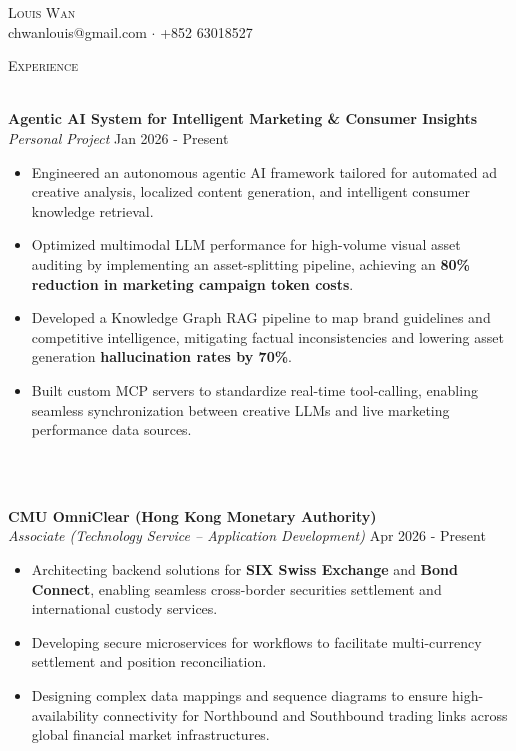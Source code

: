 \documentclass[a4paper]{article}
\newcommand{\lineunder} {
    \vspace*{-8pt} \\
    \hspace*{-18pt} \hrulefill \\
}
\newcommand{\header} [1] {
    {\hspace*{-18pt}\vspace*{6pt} \textsc{#1}}
    \vspace*{-6pt} \lineunder
}
\begin{document}
\vspace*{-40pt}

    

\vspace*{-10pt}
\begin{center}
	{\Huge \scshape {Louis Wan}}\\
	chwanlouis@gmail.com $\cdot$ +852 63018527\\
\end{center}

\header{Experience}
\vspace{1mm}

\textbf{Agentic AI System for Intelligent Marketing \& Consumer Insights} \\
\textit{Personal Project} \hfill Jan 2026 - Present\\
\vspace{-1mm}
\begin{itemize} \itemsep 1pt
    \item Engineered an autonomous agentic AI framework tailored for automated ad creative analysis, localized content generation, and intelligent consumer knowledge retrieval.
    \item Optimized multimodal LLM performance for high-volume visual asset auditing by implementing an asset-splitting pipeline, achieving an \textbf{80\% reduction in marketing campaign token costs}.
    \item Developed a Knowledge Graph RAG pipeline to map brand guidelines and competitive intelligence, mitigating factual inconsistencies and lowering asset generation \textbf{hallucination rates by 70\%}.
    \item Built custom MCP servers to standardize real-time tool-calling, enabling seamless synchronization between creative LLMs and live marketing performance data sources.
\end{itemize}


\vspace{1mm}
\lineunder
\vspace{1mm}

\textbf{CMU OmniClear (Hong Kong Monetary Authority)} \\
\textit{Associate (Technology Service – Application Development)} \hfill Apr 2026 - Present\\
\vspace{-1mm}
\begin{itemize} \itemsep 1pt
    \item Architecting backend solutions for \textbf{SIX Swiss Exchange} and \textbf{Bond Connect}, enabling seamless cross-border securities settlement and international custody services.
    \item Developing secure microservices for workflows to facilitate multi-currency settlement and position reconciliation.
    \item Designing complex data mappings and sequence diagrams to ensure high-availability connectivity for Northbound and Southbound trading links across global financial market infrastructures.
\end{itemize}
\end{document}
